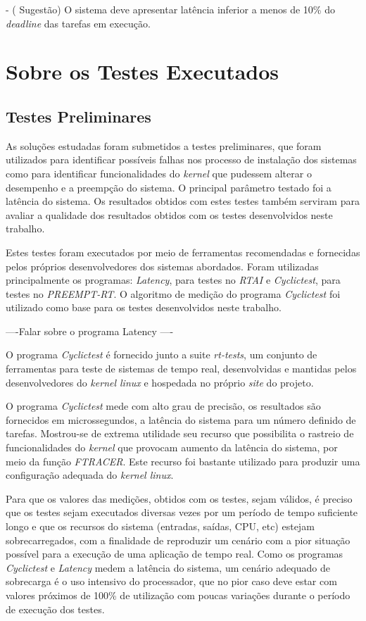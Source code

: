 - ( Sugestão) O sistema deve apresentar latência inferior a menos de 10\% do \textit{deadline} das tarefas em execução.

\section{Sobre os Testes Executados}

\subsection{Testes Preliminares}

As soluções estudadas foram submetidos a testes preliminares, que foram utilizados para identificar possíveis falhas nos processo de instalação dos sistemas como para identificar funcionalidades do \textit{kernel} que pudessem alterar o desempenho e a preempção do sistema. O principal parâmetro testado foi a latência do sistema. Os resultados obtidos com estes testes também serviram para avaliar a qualidade dos resultados obtidos com os testes desenvolvidos neste trabalho.

Estes testes foram executados por meio de ferramentas recomendadas e fornecidas pelos próprios desenvolvedores dos sistemas abordados. Foram utilizadas principalmente os programas: \textit{Latency}, para testes no \textit{RTAI} e \textit{Cyclictest}, para testes no \textit{PREEMPT-RT}. O algoritmo de medição do programa \textit{Cyclictest} foi utilizado como base para os testes desenvolvidos neste trabalho.

----Falar sobre o programa Latency ----

O programa \textit{Cyclictest} \cite{Cyclictest2017} é fornecido junto a suite \textit{rt-tests}, um conjunto de ferramentas para teste de sistemas de tempo real, desenvolvidas e mantidas pelos desenvolvedores do \textit{kernel linux} e hospedada no próprio \textit{site} do projeto.

O programa \textit{Cyclictest} mede com alto grau de precisão, os resultados são fornecidos em microssegundos, a latência do sistema para um número definido de tarefas. Mostrou-se de extrema utilidade seu recurso que possibilita o rastreio de funcionalidades do \textit{kernel} que provocam aumento da latência do sistema, por meio da função \textit{FTRACER}. Este recurso foi bastante utilizado para produzir uma configuração adequada do \textit{kernel linux}.

Para que os valores das medições, obtidos com os testes, sejam válidos, é preciso que os testes sejam executados diversas vezes por um período de tempo suficiente longo e que os recursos do sistema (entradas, saídas, CPU, etc) estejam sobrecarregados, com a finalidade de reproduzir um cenário com a pior situação possível para a execução de uma aplicação de tempo real. Como os programas \textit{Cyclictest} e \textit{Latency} medem a latência do sistema, um cenário adequado de sobrecarga é o uso intensivo do processador, que no pior caso deve estar com valores próximos de 100\% de utilização  com poucas variações durante o período de execução dos testes.

